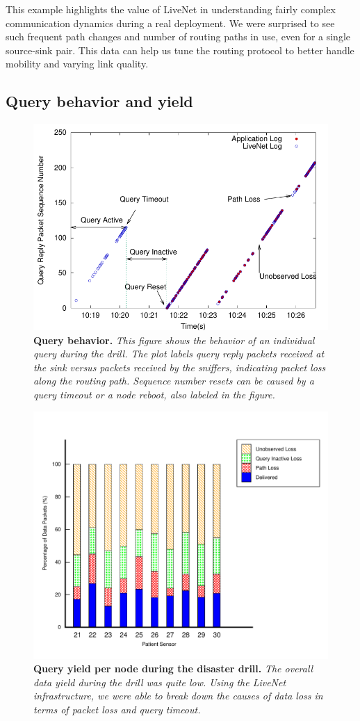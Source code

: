 This example highlights the value of LiveNet in understanding fairly
complex communication dynamics during a real deployment. We were
surprised to see such frequent path changes and number of routing paths
in use, even for a single source-sink pair. This data can help us
tune the routing protocol to better handle mobility and varying link quality.

\subsection{Query behavior and yield}

\begin{figure}[t]
\begin{center}
\includegraphics[width=0.6\hsize]{./resources/livenet-sensys07/figs/drill/query-behavior/query-behavior.pdf}
\end{center}
\caption{\small {\bf Query behavior.} 
{\em This figure shows the behavior of an individual query during the
drill. The plot labels query reply packets received at the sink versus
packets received by the sniffers, indicating packet loss along the
routing path. Sequence number resets can be caused by a query timeout
or a node reboot, also labeled in the figure.}}
\label{fig-drill-query-behavior}
\end{figure}

\begin{figure}[t]
\begin{center}
\includegraphics[width=0.6\hsize]{./resources/livenet-sensys07/figs/drill/query-breakdown/query-breakdown.pdf}
\end{center}
\caption{\small {\bf Query yield per node during the disaster drill.}
{\em The overall data yield during the drill was quite low. Using the
LiveNet infrastructure, we were able to break down the causes of data
loss in terms of packet loss and query timeout.}}
\label{fig-drill-query-yield}
\end{figure}

